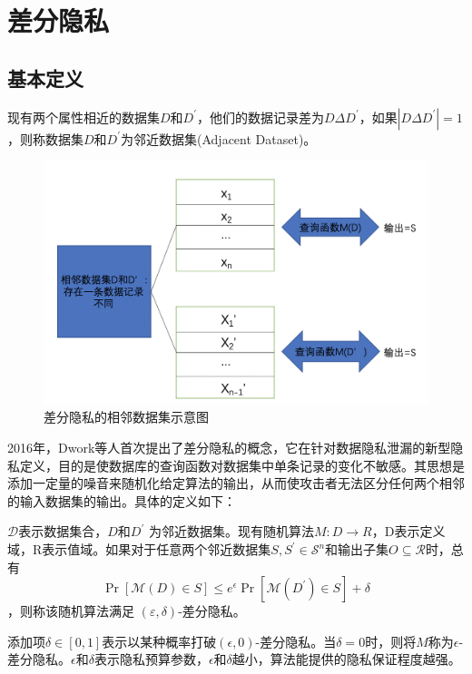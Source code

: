 \section{差分隐私}
\subsection{基本定义}
\begin{define}[邻近数据集]\label{邻近数据集}
现有两个属性相近的数据集$D$和$D^{\prime}$，他们的数据记录差为$D \Delta D^{\prime}$，如果$\left|D \Delta D^{\prime}\right|=1$，则称数据集$D$和$D^{\prime}$为邻近数据集(Adjacent Dataset)。
\end{define}

\begin{figure}[!hbt]
\centering
	\includegraphics[scale=0.6]{fig2/C2/相邻数据集示意图}%
	\caption{差分隐私的相邻数据集示意图}
	\label{fig:相邻数据集示意图}	
\end{figure}

2016年，Dwork等人首次提出了差分隐私的概念，它在针对数据隐私泄漏的新型隐私定义，目的是使数据库的查询函数对数据集中单条记录的变化不敏感。其思想是添加一定量的噪音来随机化给定算法的输出，从而使攻击者无法区分任何两个相邻的输入数据集的输出。具体的定义如下：
\begin{define}[(ε,δ)-差分隐私]\label{(ε,δ)-差分隐私}
$\mathcal{D}$表示数据集合，$D$和$D^{\prime}$ 为邻近数据集。现有随机算法$M: D \rightarrow R$，D表示定义域，R表示值域。如果对于任意两个邻近数据集$S, S^{\prime} \in \mathcal{S}^{n}$和输出子集$O \subseteq \mathcal{R}$时，总有$$
\operatorname{Pr}[\mathcal{M}(D) \in S] \leq e^{\epsilon} \operatorname{Pr}\left[\mathcal{M}\left(D^{\prime}\right) \in S\right]+\delta
$$，则称该随机算法满足 $(\varepsilon, \delta)$-差分隐私。
\end{define}
添加项$\delta \in[0,1]$表示以某种概率打破$(\epsilon, 0)$-差分隐私。当$\delta=0$时，则将$M$称为$\epsilon$-差分隐私。$\epsilon$和$\delta$表示隐私预算参数，$\epsilon$和$\delta$越小，算法能提供的隐私保证程度越强。

